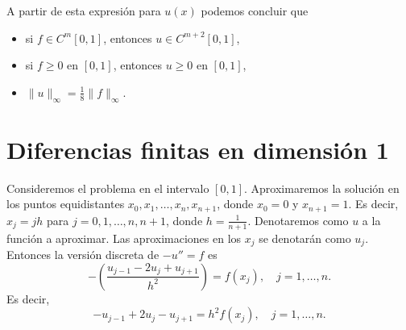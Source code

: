 \documentclass[11pt,letterpaper]{report}
\begin{document}
A partir de esta expresión para $u(x)$ podemos concluir que
\begin{itemize}
  \item
    si $f\in C^{m}[0,1]$, entonces $u\in C^{m+2}[0,1]$,
  \item
    si $f\geq 0$ en $[0,1]$, entonces $u\geq 0$ en $[0,1]$,
  \item
    $\|u\|_{\infty}=\frac{1}{8}\|f\|_\infty$.
\end{itemize}

\section{Diferencias finitas en dimensión 1}
Consideremos el problema en el intervalo $[0,1]$. Aproximaremos la
solución en los puntos equidistantes $x_0,x_1,\dots,x_n,x_{n+1}$,
donde $x_0=0$ y $x_{n+1}=1$. Es decir, $x_j=jh$ para
$j=0,1,\dots,n,n+1$, donde $h=\frac{1}{n+1}$.
Denotaremos como $u$ a la función a aproximar. Las aproximaciones en
los $x_j$ se denotarán como $u_j$. Entonces la versión discreta de
$-u''=f$ es
\begin{equation}
  - \left( \frac{u_{j-1}-2u_j+u_{j+1}}{h^{2}} \right)
    =
    f(x_j), \quad j=1,\dots,n
.\end{equation}
Es decir,
\begin{equation}
  - u_{j-1}+2u_j-u_{j+1}
    =
    h^{2} f(x_j), \quad j=1,\dots,n
.\end{equation}
\end{document}
